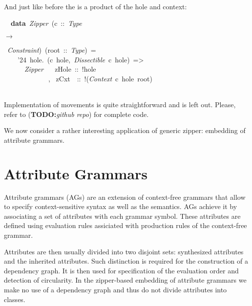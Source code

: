 \documentclass[runningheads]{llncs}
\newcommand{\texfamily}{\fontfamily{cmtex}\selectfont}
\newcommand{\WithMath}[2]{{\parbox{\widthof{#1}}{\centering$#2$}}}
\newcommand{\TODO}[1]{{\color[rgb]{1,0,0}\textbf{TODO:}\textit{#1}}}
\begin{document}
  And just like before the  is a product of the hole and context:
\begin{hscode}\SaveRestoreHook
~~{\bfseries data}~{\itshape Zipper}~(c~::~{\itshape Type}~\WithMath{->}{\rightarrow}~{\itshape Constraint})~(root~::~{\itshape Type})~=
\\
\texfamily ~~~~\char'24~hole.~(c~hole,~{\itshape Dissectible}~c~hole)~=>
\\
\texfamily ~~~~~~{\itshape Zipper}~ ~ zHole~::~!hole
\\
\texfamily ~~~~~~~~~~~~~,~ zCxt~~::~!({\itshape Context}~c~hole~root)
\\
\texfamily ~~~~~~~~~~~~~ 
\ColumnHook
\end{hscode}\resethooks

  Implementation of movements is quite straightforward and is left out. Please,
  refer to (\TODO{github repo}) for complete code.

  We now consider a rather interesting application of generic zipper: embedding of
  attribute grammars.

\section{Attribute Grammars}
  Attribute grammars (AGs) are an extension of context-free grammars that allow
  to specify context-sensitive syntax as well as the semantics. AGs achieve it
  by associating a set of attributes with each grammar symbol. These attributes
  are defined using evaluation rules assiciated with production rules of the
  context-free grammar.

  Attributes are then usually divided into two disjoint sets: synthesized
  attributes and the inherited attributes. Such distinction is required for the
  construction of a dependency graph. It is then used for specification of the
  evaluation order and detection of circularity. In the zipper-based embedding of
  attribute grammars we make no use of a dependency graph and thus do not divide
  attributes into classes.
\end{document}
